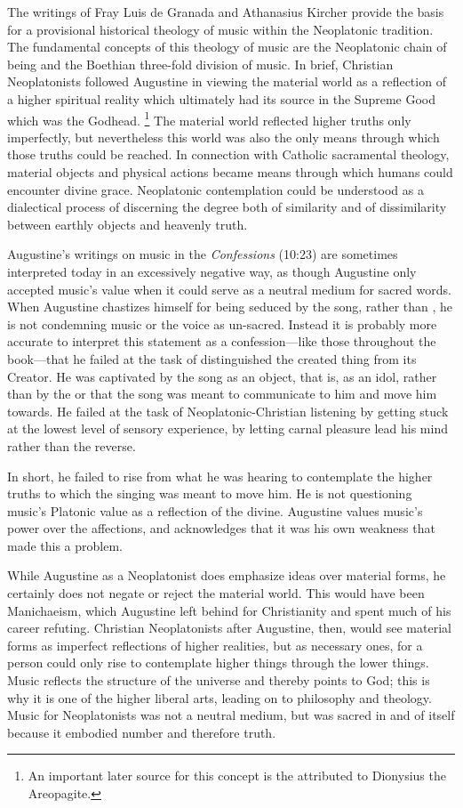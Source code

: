 The writings of Fray Luis de Granada and Athanasius Kircher provide the basis for a provisional historical theology of music within the Neoplatonic tradition. 
The fundamental concepts of this theology of music are the Neoplatonic chain of being and the Boethian three-fold division of music.
In brief, Christian Neoplatonists followed Augustine in viewing the material world as a reflection of a higher spiritual reality which ultimately had its source in the Supreme Good which was the Godhead.%
	\footnote{%
	An important later source for this concept is the  attributed to Dionysius the Areopagite. %
	}
The material world reflected higher truths only imperfectly, but nevertheless this world was also the only means through which those truths could be reached.
In connection with Catholic sacramental theology, material objects and physical actions became means through which humans could encounter divine grace.
Neoplatonic contemplation could be understood as a dialectical process of discerning the degree both of similarity and of dissimilarity between earthly objects and heavenly truth.

Augustine's writings on music in the \emph{Confessions} (10:23) are sometimes interpreted today in an excessively negative way, as though Augustine only accepted music's value when it could serve as a neutral medium for sacred words.
When Augustine chastizes himself for being seduced by the song, rather than , he is not condemning music or the voice as un-sacred.
Instead it is probably more accurate to interpret this statement as a confession---like those throughout the book---that he failed at the task of distinguished the created thing from its Creator.
He was captivated by the song as an object, that is, as an idol, rather than by the  or  that the song was meant to communicate to him and move him towards. 
He failed at the task of Neoplatonic-Christian listening by getting stuck at the lowest level of sensory experience, by letting carnal pleasure lead his mind rather than the reverse.

In short, he failed to rise from what he was hearing to contemplate the higher truths to which the singing was meant to move him.
He is not questioning music's Platonic value as a reflection of the divine.
Augustine values music's power over the affections, and acknowledges that it was his own weakness that made this a problem.  

While Augustine as a Neoplatonist does emphasize ideas over material forms, he certainly does not negate or reject the material world.
This would have been Manichaeism, which Augustine left behind for Christianity and spent much of his career refuting.
Christian Neoplatonists after Augustine, then, would see material forms as imperfect reflections of higher realities, but as necessary ones, for a person could only rise to contemplate higher things through the lower things.
Music reflects the structure of the universe and thereby points to God; this is why it is one of the higher liberal arts, leading on to philosophy and theology.
Music for Neoplatonists was not a neutral medium, but was sacred in and of itself because it embodied number and therefore truth.

